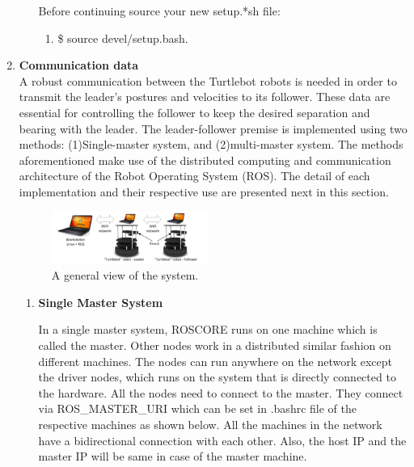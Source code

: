 \documentclass[journal]{IEEEtran}
\begin{document}
\begin{enumerate}
\begin{enumerate}
Before continuing source your new setup.*sh file:
\begin{enumerate}
\item {{\$} source devel/setup.bash}.
\end{enumerate}

\end{enumerate}








\item \textbf {Communication data}\\
A robust communication between the Turtlebot robots is needed in order to transmit the leader’s postures and velocities to its follower. These data are essential for controlling the follower to keep the desired separation and bearing with the leader. The leader-follower premise is implemented using two methods: (1)Single-master system, and (2)multi-master system. The methods aforementioned make use of the distributed computing and communication architecture of the Robot Operating System (ROS). The detail of each implementation and their respective use are presented next in this section. 

\begin{figure}[!h]
\begin{center}
\includegraphics[width=2in]{multi1.png}
\caption{A general view of the system.}
\end{center}
\end{figure}

\begin{enumerate} 
\item \textbf {Single Master System}

In a single master system, ROSCORE runs on one machine
which is called the master. Other nodes work in a distributed similar fashion on different machines. The nodes can run anywhere on the network except the driver nodes, which runs on the system that is directly connected to the hardware. All the nodes need to connect to the master. They connect via ROS{\_}MASTER{\_}URI which can be set in .bashrc file of the respective machines as shown below. All the machines in the network have a bidirectional connection with each other. Also, the host IP and the master IP will be same in case of the master machine.




\end{enumerate}
\end{enumerate}
\end{document}
